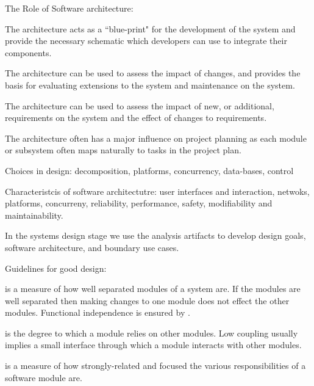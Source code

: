 \begin{compactitem}
\begin{compactitem}
\item The Role of Software architecture:
\begin{compactitem}
\item The architecture acts as a “blue-print" for the development of the system and provide the necessary schematic which developers can use to integrate their components.
\item  The architecture can be used to assess the impact of changes, and provides the basis for evaluating extensions to the system and maintenance on the system.
\item The architecture can be used to assess the impact of new, or additional, requirements on the system and the effect of changes to requirements.
\item The architecture often has a major influence on project planning as each module or subsystem often maps naturally to tasks in the project plan.
\end{compactitem}

\item Choices in design: decomposition, platforms, concurrency, data-bases, control
\item Characteristcis of software architectutre: user interfaces and interaction, netwoks, platforms, concurreny, reliability, performance, safety, modifiability and maintainability.

\item In the systems design stage we use the analysis artifacts to develop design goals, software architecture, and boundary use cases. 

\item Guidelines for good design:
\begin{compactitem}
\item {} is a measure of how well separated modules of a system are. If the modules are well separated then making changes to one module does not effect the other modules. 
Functional independence is ensured by .

\item {} is the degree to which a module relies on other modules. Low coupling usually implies a small interface through which a module interacts with other modules. 
\item {} is a measure of how strongly-related and focused the various responsibilities of a software module are.
\end{compactitem}


\end{compactitem}
\end{compactitem}
